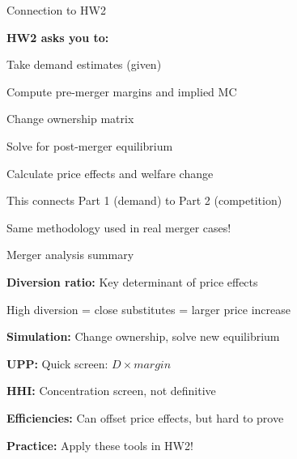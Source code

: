 \documentclass[notes,11pt, aspectratio=169]{beamer}
\newenvironment{wideitemize}{\itemize\addtolength{\itemsep}{10pt}}{\enditemize}
\newenvironment{wideenumerate}{\enumerate\addtolength{\itemsep}{10pt}}{\endenumerate}
\begin{document}
\begin{frame}{Connection to HW2}
	\begin{wideitemize}
		\item \textbf{HW2 asks you to:}
		\begin{wideenumerate}
			\vspace{5pt}
			\item Take demand estimates (given)
			\item Compute pre-merger margins and implied MC
			\item Change ownership matrix
			\item Solve for post-merger equilibrium
			\item Calculate price effects and welfare change
		\end{wideenumerate}
		\item This connects Part 1 (demand) to Part 2 (competition)
		\item Same methodology used in real merger cases!
	\end{wideitemize}
\end{frame}

\begin{frame}{Merger analysis summary}
	\begin{wideenumerate}
		\item \textbf{Diversion ratio:} Key determinant of price effects
		\begin{wideitemize}
			\vspace{3pt}
			\item High diversion = close substitutes = larger price increase
		\end{wideitemize}
		\item \textbf{Simulation:} Change ownership, solve new equilibrium
		\item \textbf{UPP:} Quick screen: $D \times margin$
		\item \textbf{HHI:} Concentration screen, not definitive
		\item \textbf{Efficiencies:} Can offset price effects, but hard to prove
		\item \textbf{Practice:} Apply these tools in HW2!
	\end{wideenumerate}
\end{frame}

\end{document}
